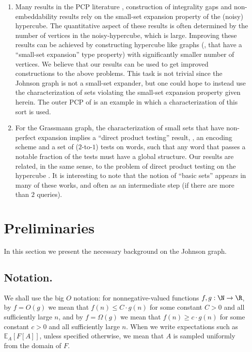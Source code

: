 \documentclass{toc}
\newcommand\E{\mathbb{E}}
\renewcommand\geq{\geqslant}
\renewcommand\leq{\leqslant}
\begin{document}
\begin{enumerate}
   \item Many results in the PCP literature \cite{Has01}, construction of integrality gaps and non-embeddability results \cite{KhotVishnoi,KN}
  rely on the small-set expansion property of the (noisy) hypercube. The quantitative aspect of these results is often determined by the number
  of vertices in the noisy-hypercube, which is large. Improving
  these results can be achieved by constructing hypercube like graphs (\eg, that have a ``small-set expansion'' type property) with significantly
  smaller number of vertices. We believe that our results can be used to get improved constructions to the above problems. This task is not trivial since
  the Johnson graph %
  is not a small-set expander, but one could hope to instead use the characterization of sets violating the small-set expansion property
  given herein. The outer PCP of \cite{KMS,DKKMSgras} is an example in which a characterization of this sort is used.

  \item For the Grassmann graph, the characterization of small sets that have non-perfect expansion implies a ``direct product testing'' result,
  \ie, an encoding scheme and a set of ($2$-to-$1$) tests on words, such that any word that passes a notable fraction of the tests must have a global structure.
  Our results are related, in the same sense, to the problem of direct product testing on the hypercube \cite{IKW12,DN17,DDGKS17}.
  It is interesting to note that the notion of ``basic sets'' appears in many of these works, and often as an intermediate step (if there
  are more than $2$ queries).
\end{enumerate}


\section{Preliminaries}
In this section we present the necessary background on the Johnson graph.

%
%
\subsection{Notation.}   %
We shall use
the  %
big $O$ %
notation:   %
for nonnegative-valued functions $f,g: \N \to \R$,
by $f = O(g)$ we mean that %
$f(n)\leq C\cdot g(n)$  %
for some %
%
constant $C>0$
 and all sufficiently large $n$, %
and by $f=\Omega(g)$ we mean that %
$f(n) \geq c\cdot g(n)$   %
for some %
constant $c>0$   %
and all sufficiently large $n$.  %
When we write expectations such as $\E_A[F[A]]$, unless specified otherwise, we mean that $A$ is sampled uniformly
from the domain of $F$.%
%
%
%
%
%
%
%
%
\end{document}

